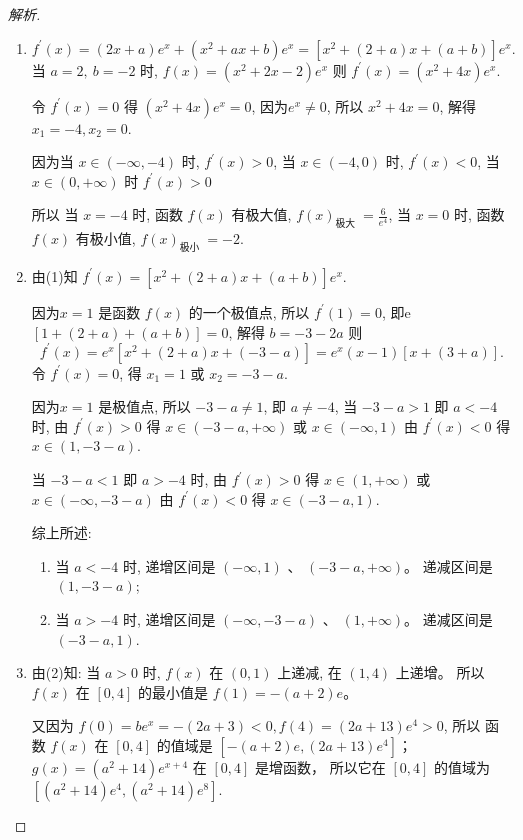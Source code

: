 \begin{proof}[解析]
  \begin{enumerate}[(1)]
    \item 
      \[f^{\prime}(x)=(2 x+a) e^{x}+\left(x^{2}+a x+b\right) e^{x}=\left[x^{2}+(2+a) x+(a+b)\right] e^{x}.\] 当 ${a}=2, {~b}=-2$ 时, $f(x)=\left(x^{2}+2 x-2\right) e^{x}$ 则 $f^{\prime}(x)=\left(x^{2}+4 x\right) e^{x}$.

      令 $f^{\prime}(x)=0$ 得 $\left(x^{2}+4 x\right) e^{x}=0$,  因为$e^{x} \neq 0$, 所以 $x^{2}+4 x=0$, 解得 $x_{1}=-4, x_{2}=0$.

      因为当 $x \in(-\infty,-4)$ 时, $f^{\prime}(x) > 0$,
      当 $x \in(-4,0)$ 时, $f^{\prime}(x) < 0$, 当 $x \in(0,+\infty)$ 时 $f^{\prime}(x) > 0$

      所以 当 $x=-4$ 时, 函数 $f(x)$ 有极大值, $f(x)_{\text {极大 }}=\frac{6}{e^{4}}$,
      当 $x=0$ 时, 函数 $f(x)$ 有极小值, $f(x)_{\text {极小 }}=-2$.
    \item 
      由(1)知 $f^{\prime}(x)=\left[x^{2}+(2+a) x+(a+b)\right] e^{x}$.

      因为$x=1$ 是函数 $f(x)$ 的一个极值点, 所以 $f^{\prime}(1)=0$,
      即e $[1+(2+a)+(a+b)]=0$, 解得 $b=-3-2 a$
      则 \[f^{\prime}(x)=e^{x}\left[x^{2}+(2+a) x+(-3-a)\right]=e^{x}(x-1)[x+(3+a)].\]
      令 $f^{\prime}(x)=0$, 得 $x_{1}=1$ 或 $x_{2}=-3-a$.

      因为$x=1$ 是极值点, 所以 $-3-a \neq 1$, 即 $a \neq-4$,
      当 $-3-a > 1$ 即 $a <-4$ 时, 由 $f^{\prime}(x) > 0$ 得 $x \in(-3-a,+\infty)$ 或 $x \in(-\infty, 1)$
      由 $f^{\prime}(x) < 0$ 得 $x \in(1,-3-a)$.

      当 $-3-a < 1$ 即 $a >-4$ 时, 由 $f^{\prime}(x) > 0$ 得 $x \in(1,+\infty)$ 或 $x \in(-\infty,-3-a)$
      由 $f^{\prime}(x) < 0$ 得 $x \in(-3-a, 1)$.
      
      综上所述:
      \begin{enumerate}[1)]
        \item 当 $a<-4$ 时, 递增区间是 $(-\infty, 1)$ 、 $(-3-a,+\infty)$。 递减区间是 $(1,-3-a)$;
        \item 当 $a>-4$ 时, 递增区间是 $(-\infty,-3-a)$ 、 $(1,+\infty)$。 递减区间是 $(-3-a, 1)$.
      \end{enumerate}

    \item 
      由(2)知: 当 $a>0$ 时, $f(x)$ 在 $(0,1)$ 上递减, 在 $(1,4)$ 上递增。
      所以$f(x)$ 在 $[0,4]$ 的最小值是 $f(1)=-(a+2) e$。

      又因为 $f(0)=b e^{x}=-(2 a+3)<0, f(4)=(2 a+13) e^{4}>0$,
      所以 函数 $f(x)$ 在 $[0,4]$ 的值域是 $\left[-(a+2) e,(2 a+13) e^{4}\right]$；$g(x)=\left(a^{2}+14\right) e^{x+4}$ 在 $[0,4]$ 是增函数，
      所以它在 $[0,4]$ 的值域为 $\left[\left(a^{2}+14\right) e^{4},\left(a^{2}+14\right) e^{8}\right]$.


\end{enumerate}
\end{proof}
